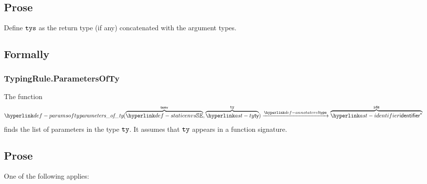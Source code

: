 \subsection{Prose}
Define $\tys$ as the return type (if any) concatenated with the argument types.

\subsection{Formally}
\begin{mathpar}
\end{mathpar}


\subsubsection{TypingRule.ParametersOfTy \label{sec:TypingRule.ParametersOfTy}}
\hypertarget{def-paramsofty}{}
The function
\[
\paramsofty(\overname{\staticenvs}{\tenv}, \overname{\ty}{\tty}) \typearrow \overname{\identifier^*}{\ids}
\]
finds the list of parameters in the type $\tty$.
It assumes that $\tty$ appears in a function signature.

\subsection{Prose}
One of the following applies:

